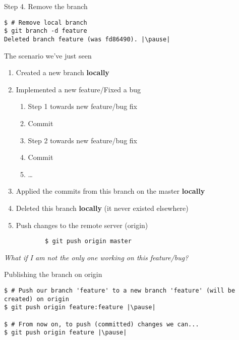 \begin{frame}[fragile]{Step 4. Remove the branch}
  	\begin{lstlisting}
$ # Remove local branch
$ git branch -d feature
Deleted branch feature (was fd86490). |\pause|
	\end{lstlisting}
\end{frame}


\begin{frame}[fragile]{The scenario we've just seen}
	\begin{enumerate}
		\item Created a new branch \textbf{locally}
		\item Implemented a new feature/Fixed a bug
		\begin{enumerate}
			\item Step 1 towards new feature/bug fix
			\item Commit
			\item Step 2 towards new feature/bug fix
			\item Commit
			\item \ldots
		\end{enumerate}
		\item Applied the commits from this branch on the master \textbf{locally}
		\item Deleted this branch \textbf{locally} (it never existed elsewhere)
		\pause
		\item Push changes to the remote server (origin)
		\begin{lstlisting}
		$ git push origin master
		\end{lstlisting}
	\end{enumerate}
	\pause
	\textit{What if I am not the only one working on this feature/bug?}
\end{frame}

\begin{frame}[fragile]{Publishing the branch on origin}
	\begin{lstlisting}
$ # Push our branch 'feature' to a new branch 'feature' (will be created) on origin
$ git push origin feature:feature |\pause|

$ # From now on, to push (committed) changes we can...
$ git push origin feature |\pause|
	\end{lstlisting}
\end{frame}

